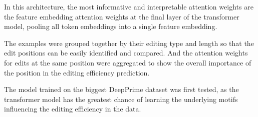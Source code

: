 In this architecture, the most informative and interpretable attention weights are the feature embedding attention weights at the final layer of the transformer model, pooling all token embeddings into a single feature embedding. 

The examples were grouped together by their editing type and length so that the edit positions can be easily identified and compared. And the attention weights for edits at the same position were aggregated to show the overall importance of the position in the editing efficiency prediction.

The model trained on the biggest DeepPrime dataset was first tested, as the transformer model has the greatest chance of learning the underlying motifs influencing the editing efficiency in the data.